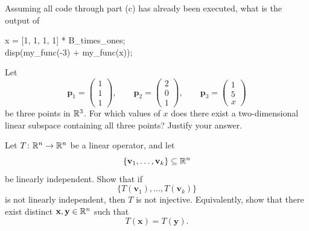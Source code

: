 \begin{problem}
\begin{problemsubparts}[resume]
\item Assuming all code through part \textup{(c)} has already been executed, what is the output of

{\small\ttfamily
\begin{tabbing}
x = [1, 1, 1, 1] * B\_times\_ones;\\
disp(my\_func(-3) + my\_func(x));
\end{tabbing}
}
\end{problemsubparts}
\end{problem}

\begin{problem}
Let
\[
\mathbf p_1=
\begin{pmatrix}1\\1\\1\end{pmatrix},
\qquad
\mathbf p_2=
\begin{pmatrix}2\\0\\1\end{pmatrix},
\qquad
\mathbf p_3=
\begin{pmatrix}1\\5\\x\end{pmatrix}
\]
be three points in $\mathbb{R}^3$. For which values of $x$ does there exist a two-dimensional linear subspace containing all three points? Justify your answer.
\end{problem}

\begin{problem}
Let $T\colon\mathbb{R}^n\to\mathbb{R}^n$ be a linear operator, and let
\[
\{\mathbf v_1,\dots,\mathbf v_k\}\subseteq\mathbb{R}^n
\]
be linearly independent. Show that if
\[
\{T(\mathbf v_1),\dots,T(\mathbf v_k)\}
\]
is not linearly independent, then $T$ is not injective. Equivalently, show that there exist distinct $\mathbf x,\mathbf y\in\mathbb{R}^n$ such that
\[
T(\mathbf x)=T(\mathbf y).
\]
\end{problem}

